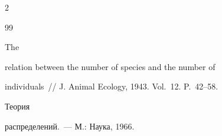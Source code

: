\begin{multicols}{2}
{{\begin{thebibliography}{99}


  The


relation between the number of species and the number of


individuals~// J. Animal Ecology, 1943. Vol.~12. P.~42--58.





 \label{end\stat}





  Теория


распределений.~--- М.: Наука, 1966.


 \end{thebibliography}


}


}








\end{multicols}


